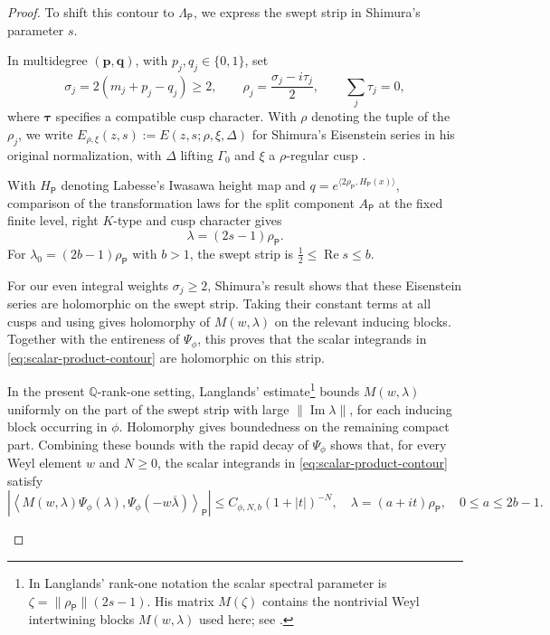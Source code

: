 \documentclass[11pt]{article}
\theoremstyle{definition}
\theoremstyle{plain}
\numberwithin{equation}{section}
\begin{document}
\begin{proof}
To shift this contour to $\Lambda_{\mathsf P}$, we express the swept
strip in Shimura's parameter $s$.

In multidegree $(\boldsymbol p,\boldsymbol q)$, with
$p_j,q_j\in\{0,1\}$, set
\begin{equation}\label{eq:weights}
 \sigma_j=2(m_j+p_j-q_j)\geq2,\qquad
 \rho_j=\frac{\sigma_j-i\tau_j}{2},\qquad
 \sum_j\tau_j=0,
\end{equation}
where $\boldsymbol\tau$ specifies a compatible cusp character. With
$\rho$ denoting the tuple of the $\rho_j$, we write
$E_{\rho,\xi}(z,s):=E(z,s;\rho,\xi,\Delta)$ for Shimura's Eisenstein
series in his original normalization, with $\Delta$ lifting $\Gamma_0$
and $\xi$ a $\rho$-regular cusp
\cite[(1.14)--(1.17), (3.10), (4.1), (4.4)]{Shimura}.

With $H_{\mathsf P}$ denoting Labesse's Iwasawa height map and
$q=e^{\langle2\rho_{\mathsf P},H_{\mathsf P}(x)\rangle}$, comparison of
the transformation laws for the split component $A_{\mathsf P}$ at the fixed finite level,
right $K$-type and cusp character
\cite[\S2.8]{Labesse}\cite[(1.6), (4.1)]{Shimura} gives
\begin{equation}\label{eq:parameter}
 \lambda=(2s-1)\rho_{\mathsf P}.
\end{equation}
For $\lambda_0=(2b-1)\rho_{\mathsf P}$ with $b>1$, the swept strip is
$\tfrac12\leq\operatorname{Re}s\leq b$.

For our even integral weights $\sigma_j\geq2$, Shimura's result
\cite[Thm.~4.2, pp.~18--19]{Shimura} shows that these Eisenstein series
are holomorphic on the swept strip. Taking their constant terms at all
cusps and using \cite[Lem.~2.9.2]{Labesse} gives holomorphy of
$M(w,\lambda)$ on the relevant inducing blocks. Together with the
entireness of $\Psi_\phi$, this proves that the scalar integrands in
\eqref{eq:scalar-product-contour} are holomorphic on this strip.

\begin{samepage}
In the present $\mathbb Q$-rank-one setting, Langlands' estimate\footnote{%
In Langlands' rank-one notation the scalar spectral parameter is
$\zeta=\|\rho_{\mathsf P}\|(2s-1)$. His matrix $M(\zeta)$ contains the
nontrivial Weyl intertwining blocks $M(w,\lambda)$ used here; see
\cite[\S6, pp.~83--84, 90]{Langlands}.}
bounds $M(w,\lambda)$ uniformly on the part of the swept strip with
large $\|\operatorname{Im}\lambda\|$, for each inducing block occurring
in $\phi$. Holomorphy gives boundedness on the remaining compact part.
Combining these bounds with the rapid decay of $\Psi_\phi$ shows that, for every
Weyl element $w$ and $N\geq0$, the scalar integrands in
\eqref{eq:scalar-product-contour} satisfy
\begin{equation}\label{eq:contour-decay}
 \left|\left\langle
   M(w,\lambda)\Psi_\phi(\lambda),
   \Psi_\phi(-w\overline\lambda)
 \right\rangle_{\mathsf P}\right|
 \leq C_{\phi,N,b}(1+|t|)^{-N},\quad
 \lambda=(a+it)\rho_{\mathsf P},\quad 0\leq a\leq2b-1.
\end{equation}
\end{samepage}


\end{proof}
\end{document}

